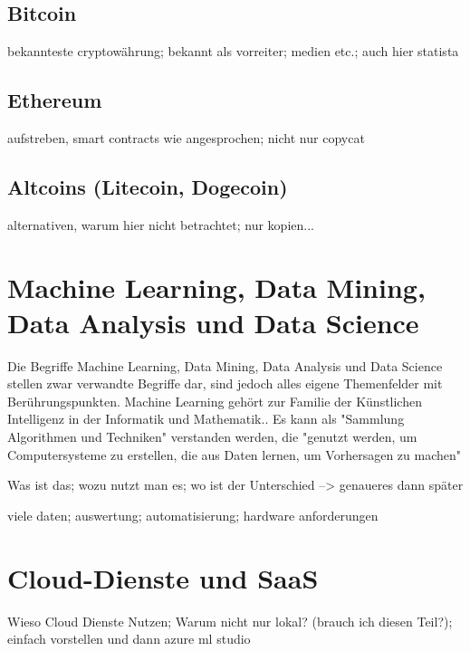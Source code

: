 \subsection{Bitcoin}\label{subsec:Bitcoin}

bekannteste cryptowährung; bekannt als vorreiter; medien etc.; auch hier statista


\subsection{Ethereum}\label{subsec:Ethereum}
aufstreben, smart contracts wie angesprochen; nicht nur copycat


\subsection{Altcoins (Litecoin, Dogecoin)}\label{subsec:Altcoins}
alternativen, warum hier nicht betrachtet; nur kopien...




\section{Machine Learning, Data Mining, Data Analysis und Data Science}
Die Begriffe Machine Learning, Data Mining, Data Analysis und Data Science stellen zwar verwandte Begriffe dar, sind jedoch alles eigene Themenfelder mit Berührungspunkten. \newline
Machine Learning gehört zur Familie der Künstlichen Intelligenz in der Informatik und Mathematik.. Es kann als "Sammlung Algorithmen und Techniken" verstanden werden, die "genutzt werden, um Computersysteme zu erstellen, die aus Daten lernen, um Vorhersagen zu machen" \citep[S.~53]{kim_matlab_2017}


Was ist das; wozu nutzt man es; wo ist der Unterschied --> genaueres dann später

viele daten; auswertung; automatisierung; hardware anforderungen


\section{Cloud-Dienste und SaaS}
Wieso Cloud Dienste Nutzen; Warum nicht nur lokal? (brauch ich diesen Teil?); einfach vorstellen und dann azure ml studio
